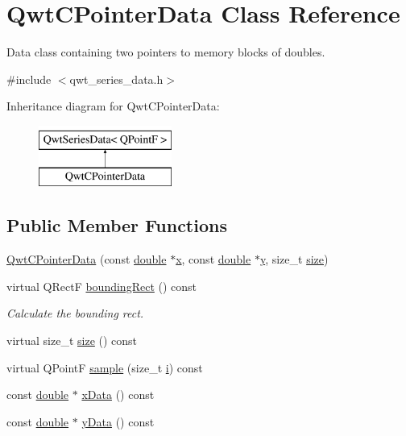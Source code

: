\hypertarget{class_qwt_c_pointer_data}{\section{Qwt\-C\-Pointer\-Data Class Reference}
\label{class_qwt_c_pointer_data}
}


Data class containing two pointers to memory blocks of doubles.  




{\ttfamily \#include $<$qwt\-\_\-series\-\_\-data.\-h$>$}

Inheritance diagram for Qwt\-C\-Pointer\-Data\-:\begin{figure}[H]
\begin{center}
\leavevmode
\includegraphics[height=2.000000cm]{class_qwt_c_pointer_data}
\end{center}
\end{figure}
\subsection*{Public Member Functions}
\begin{DoxyCompactItemize}
\item 
\hyperlink{class_qwt_c_pointer_data_a795b86d69226d1aabf9356848da6c083}{Qwt\-C\-Pointer\-Data} (const \hyperlink{_super_l_u_support_8h_a8956b2b9f49bf918deed98379d159ca7}{double} $\ast$\hyperlink{glext_8h_a1db9d104e3c2128177f26aff7b46982f}{x}, const \hyperlink{_super_l_u_support_8h_a8956b2b9f49bf918deed98379d159ca7}{double} $\ast$\hyperlink{glext_8h_a42315f3ed8fff752bb47fd782309fcfc}{y}, size\-\_\-t \hyperlink{glext_8h_a014d89bd76f74ef3a29c8f04b473eb76}{size})
\item 
virtual Q\-Rect\-F \hyperlink{class_qwt_c_pointer_data_aecc3e98a3b2c4350212fa7b9e97110aa}{bounding\-Rect} () const 
\begin{DoxyCompactList}\small\item\em Calculate the bounding rect. \end{DoxyCompactList}\item 
virtual size\-\_\-t \hyperlink{class_qwt_c_pointer_data_a780b9ae434856509cef9bbe954f03a3e}{size} () const 
\item 
virtual Q\-Point\-F \hyperlink{class_qwt_c_pointer_data_a5e01b287eca7d0c4b52bbf514c5244d2}{sample} (size\-\_\-t \hyperlink{uavobjecttemplate_8m_a6f6ccfcf58b31cb6412107d9d5281426}{i}) const 
\item 
const \hyperlink{_super_l_u_support_8h_a8956b2b9f49bf918deed98379d159ca7}{double} $\ast$ \hyperlink{class_qwt_c_pointer_data_a6409b0bcf77674d1970185c6c3245e26}{x\-Data} () const 
\item 
const \hyperlink{_super_l_u_support_8h_a8956b2b9f49bf918deed98379d159ca7}{double} $\ast$ \hyperlink{class_qwt_c_pointer_data_a7c538ed7b3e4cc5db6d4d97c09ed9d73}{y\-Data} () const 
\end{DoxyCompactItemize}
